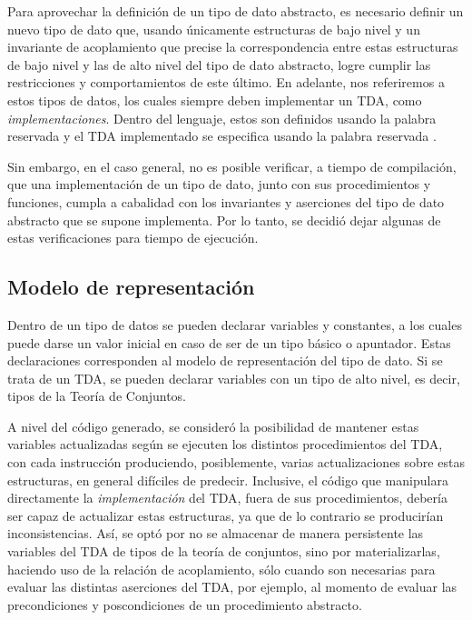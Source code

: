 {{Para aprovechar la definición de un tipo de dato abstracto, es necesario definir
un nuevo tipo de dato que, usando únicamente estructuras de bajo nivel y un
invariante de acoplamiento que precise la correspondencia entre estas
estructuras de bajo nivel y las de alto nivel del tipo de dato abstracto, logre
cumplir las restricciones y comportamientos de este último. En adelante, nos
referiremos a estos tipos de datos, los cuales siempre deben implementar un TDA,
como \textit{implementaciones}. Dentro del lenguaje, estos son definidos usando
la palabra reservada  y el TDA implementado se especifica usando la
palabra reservada .

Sin embargo, en el caso general, no es posible verificar, a tiempo de
compilación, que una implementación de un tipo de dato, junto con sus
procedimientos y funciones, cumpla a cabalidad con los invariantes y aserciones
del tipo de dato abstracto que se supone implementa. Por lo tanto, se decidió
dejar algunas de estas verificaciones para tiempo de ejecución.

\subsection{Modelo de representación}

Dentro de un tipo de datos se pueden declarar variables y constantes, a los
cuales puede darse un valor inicial en caso de ser de un tipo básico o
apuntador. Estas declaraciones corresponden al modelo de representación del tipo
de dato. Si se trata de un TDA, se pueden declarar variables con un tipo de alto
nivel, es decir, tipos de la Teoría de Conjuntos.

A nivel del código generado, se consideró la posibilidad de mantener estas
variables actualizadas según se ejecuten los distintos procedimientos del TDA,
con cada instrucción produciendo, posiblemente, varias actualizaciones sobre
estas estructuras, en general difíciles de predecir. Inclusive, el código que
manipulara directamente la \textit{implementación} del TDA, fuera de sus
procedimientos, debería ser capaz de actualizar estas estructuras, ya que de lo
contrario se producirían inconsistencias. Así, se optó por no se almacenar de
manera persistente las variables del TDA de tipos de la teoría de conjuntos,
sino por materializarlas, haciendo uso de la relación de acoplamiento, sólo
cuando son necesarias para evaluar las distintas aserciones del TDA, por
ejemplo, al momento de evaluar las precondiciones y poscondiciones de un
procedimiento abstracto.

}}
